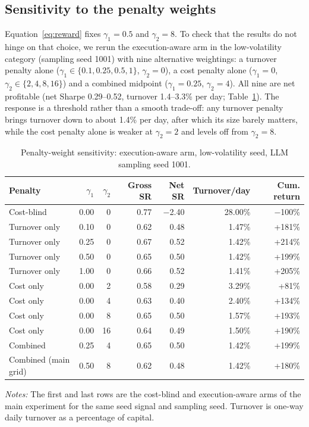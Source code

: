 \documentclass[preprint,12pt,authoryear]{elsarticle}
\newcommand{\tablenote}[1]{\par\vspace{0.4em}\begin{minipage}{\linewidth}\footnotesize #1\end{minipage}}
\begin{document}
\subsection{Sensitivity to the penalty weights}\label{sec:gamma}

Equation~\eqref{eq:reward} fixes $\gamma_1 = 0.5$ and $\gamma_2 = 8$. To check that the results do not hinge on that choice, we rerun the execution-aware arm in the low-volatility category (sampling seed 1001) with nine alternative weightings: a turnover penalty alone ($\gamma_1 \in \{0.1, 0.25, 0.5, 1\}$, $\gamma_2 = 0$), a cost penalty alone ($\gamma_1 = 0$, $\gamma_2 \in \{2, 4, 8, 16\}$) and a combined midpoint ($\gamma_1 = 0.25$, $\gamma_2 = 4$). All nine are net profitable (net Sharpe 0.29--0.52, turnover 1.4--3.3\% per day; Table~\ref{tab:gamma}). The response is a threshold rather than a smooth trade-off: any turnover penalty brings turnover down to about 1.4\% per day, after which its size barely matters, while the cost penalty alone is weaker at $\gamma_2 = 2$ and levels off from $\gamma_2 = 8$.

\begin{table}[t]
\centering
\caption{Penalty-weight sensitivity: execution-aware arm, low-volatility seed, LLM sampling seed 1001.}
\label{tab:gamma}
\footnotesize
\begin{tabular}{lrrrrrr}
\toprule
Penalty & $\gamma_1$ & $\gamma_2$ & Gross SR & Net SR & Turnover/day & Cum. return \\
\midrule
Cost-blind & 0.00 & 0 & 0.77 & $-$2.40 & 28.00\% & $-$100\% \\
Turnover only & 0.10 & 0 & 0.62 & 0.48 & 1.47\% & +181\% \\
Turnover only & 0.25 & 0 & 0.67 & 0.52 & 1.42\% & +214\% \\
Turnover only & 0.50 & 0 & 0.65 & 0.50 & 1.42\% & +199\% \\
Turnover only & 1.00 & 0 & 0.66 & 0.52 & 1.41\% & +205\% \\
Cost only & 0.00 & 2 & 0.58 & 0.29 & 3.29\% & +81\% \\
Cost only & 0.00 & 4 & 0.63 & 0.40 & 2.40\% & +134\% \\
Cost only & 0.00 & 8 & 0.65 & 0.50 & 1.57\% & +193\% \\
Cost only & 0.00 & 16 & 0.64 & 0.49 & 1.50\% & +190\% \\
Combined & 0.25 & 4 & 0.65 & 0.50 & 1.42\% & +199\% \\
Combined (main grid) & 0.50 & 8 & 0.62 & 0.48 & 1.42\% & +180\% \\
\bottomrule
\end{tabular}
\tablenote{\emph{Notes:} The first and last rows are the cost-blind and execution-aware arms of the main experiment for the same seed signal and sampling seed. Turnover is one-way daily turnover as a percentage of capital.}
\end{table}
\end{document}
